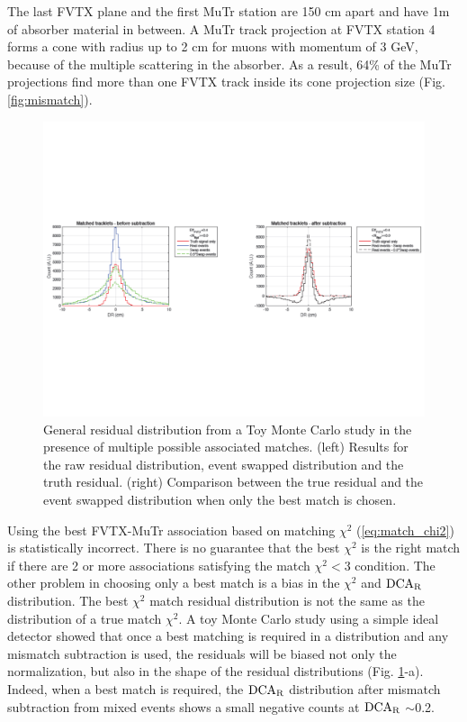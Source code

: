 \documentclass[12pt]{article}
\newcommand{\dcar}{$\rm{DCA}_{R}$ }
\begin{document}
The last FVTX plane and the first MuTr station are 150 cm apart and have 1m of absorber material in between. A MuTr track projection at FVTX station 4 forms 
a cone with radius up to 2 cm for muons with momentum of 3 GeV, because of the multiple scattering in the absorber. As a result, 64\% of the MuTr projections find 
more than one FVTX track inside its cone projection size (Fig. \ref{fig:mismatch}).

\begin{figure}[!htb]
	\includegraphics[width=1.0\textwidth]{Figures/swapp_bias}	
	\caption{\label{fig:toy_model_match} General residual distribution from a Toy Monte Carlo study in the presence of multiple possible associated matches. 
	(left) Results for the raw residual distribution, event swapped distribution and the truth residual. 
	(right) Comparison between the true residual and the event swapped distribution when only the best match is chosen.}
\end{figure}

Using the best FVTX-MuTr association based on matching $\chi^2$ (\ref{eq:match_chi2}) is statistically incorrect. There is no guarantee 
that the best $\chi^2$ is the right match if there are 2 or more associations satisfying the match $\chi^2<3$ condition. 
The other problem in choosing only a best match is a bias in the $\chi^2$ and \dcar distribution. The best $\chi^2$ match 
residual distribution is not the same as the distribution of a true match $\chi^2$. A toy Monte Carlo study using a simple ideal detector 
showed that once a best matching is required in a distribution and any mismatch subtraction is used, the residuals will be biased not only 
 the normalization, but also in the shape of the residual distributions (Fig. \ref{fig:toy_model_match}-a). Indeed, when a best match is required, 
 the \dcar distribution after mismatch subtraction from mixed events shows a small negative counts at \dcar$\sim$0.2.
\end{document}
